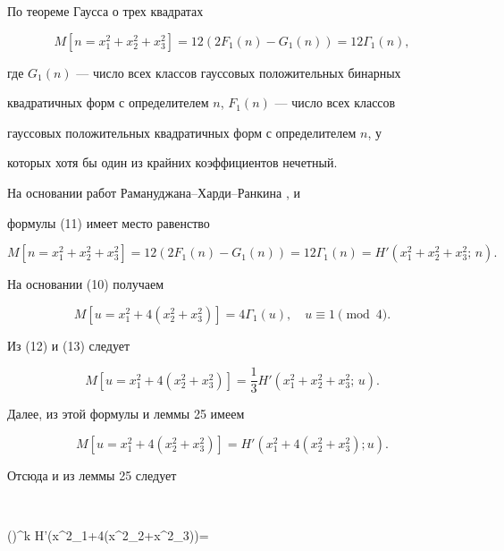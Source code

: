 По теореме Гаусса о трех квадратах \cite{K10}


\begin{equation}


M[n=x^2_1+x^2_2+x^2_3]=12(2F_1(n)-G_1(n))=12\Gamma_1(n),


\end{equation}


где $G_1(n)$ --- число всех классов гауссовых положительных бинарных


квадратичных форм с определителем $n$, $F_1(n)$ --- число всех классов


гауссовых положительных квадратичных форм с определителем $n$, у


которых хотя бы один из крайних коэффициентов нечетный.





На основании работ Рамануджана--Харди--Ранкина \cite{R13}, \cite{R14} и


формулы (11) имеет место равенство


\begin{equation}


M[n=x^2_1+x^2_2+x^2_3]=12(2F_1(n)-G_1(n))=


12\Gamma_1(n)=H'(x^2_1+x^2_2+x^2_3;\,n).


\end{equation}


На основании (10) получаем


\begin{equation}


M[u=x^2_1+4(x^2_2+x^2_3)]=4\Gamma_1(u),\quad


u\equiv 1\pmod{4}.


\end{equation}


Из (12) и (13) следует


$$


M[u=x^2_1+4(x^2_2+x^2_3)]=\frac{1}{3}H'


(x^2_1+x^2_2+x^2_3;\,u).


$$


Далее, из этой формулы и леммы 25 \cite{L4} имеем


$$


M[u=x^2_1+4(x^2_2+x^2_3)]=H'(x^2_1+4(x^2_2+x^2_3);u).


$$


Отсюда и из леммы 25 \cite{L4} следует


$$


\left(\right)^k H'(x^2_1+4(x^2_2+x^2_3))=


